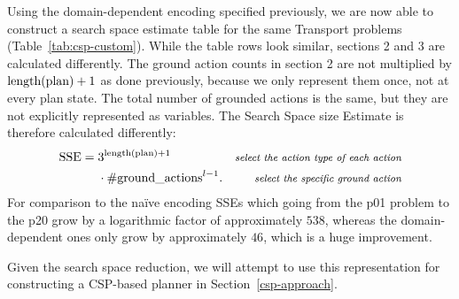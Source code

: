 Using the domain-dependent encoding specified previously, we are now able to construct
a search space estimate table for the same Transport problems (Table~\ref{tab:csp-custom}). While the table rows look similar, sections 2 and 3 are calculated
differently. The ground action counts in section 2 are not multiplied by $\textrm{length(plan)} + 1$
as done previously, because we only represent them once, not at every plan state.
The total number of grounded actions is the same, but they are not explicitly represented as variables. The Search Space size Estimate is therefore calculated differently:
\begin{align*}
\textrm{SSE} =\; &3^{\textrm{length(plan)} + 1} & \textit{\footnotesize select the action type of each action}\\
&\cdot \textrm{\#ground\_actions}^{l-1}. & \textit{\footnotesize select the specific ground action}
\end{align*}
For comparison to the na{\"{i}}ve encoding SSEs which going from the p01 problem to the p20 grow by a logarithmic factor of approximately $538$,
whereas the domain-dependent ones only grow by approximately $46$,
which is a huge improvement.

Given the search space reduction, we will attempt to use this representation
for constructing a CSP-based planner in Section~\ref{csp-approach}.
